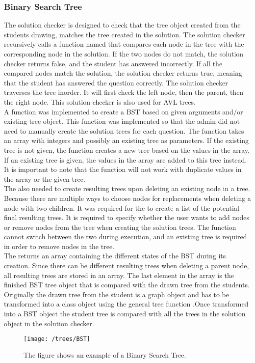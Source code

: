 \subsubsection{Binary Search Tree}
The solution checker is designed to check that the tree object created from the students drawing, matches the tree created in the solution. The solution checker recursively calls a function named  that compares each node in the tree with the corresponding node in the solution. If the two nodes do not match, the solution checker returns false, and the student has answered incorrectly. If all the compared nodes match the solution, the solution checker returns true, meaning that the student has answered the question correctly. The solution checker traverses the tree inorder. It will first check the left node, then the parent, then the right node. This solution checker is also used for AVL trees.
\\[11pt]
A function  was implemented to create a BST based on given arguments and/or existing tree object. This function was implemented so that the admin did not need to manually create the solution trees for each question. The function takes an array with integers and possibly an existing tree as parameters. If the existing tree is not given, the function creates a new tree based on the values in the array. If an existing tree is given, the values in the array are added to this tree instead. It is important to note that the function will not work with duplicate values in the array or the given tree.
\\[11pt]
The  also needed to create resulting trees upon deleting an existing node in a tree. Because there are multiple ways to choose nodes for replacements when deleting a node with two children. It was required for the  to create a list of the potential final resulting trees. It is required to specify whether the user wants to add nodes or remove nodes from the tree when creating the solution trees. The function cannot switch between the two during execution, and an existing tree is required in order to remove nodes in the tree.
\\[11pt]
The  returns an array containing the different states of the BST during its creation. Since there can be different resulting trees when deleting a parent node, all resulting trees are stored in an array. The last element in the array is the finished BST tree object that is compared with the drawn tree from the students. Originally the drawn tree from the student is a graph object and has to be transformed into a  class object using the general tree function .Once transformed into a BST object the student tree is compared with all the trees in the solution object in the solution checker.
\begin{figure}[H]
    \centering
    \texttt{[image: /trees/BST]}
    \caption{The figure shows an example of a Binary Search Tree.}    
    \label{fig:BST}
\end{figure}